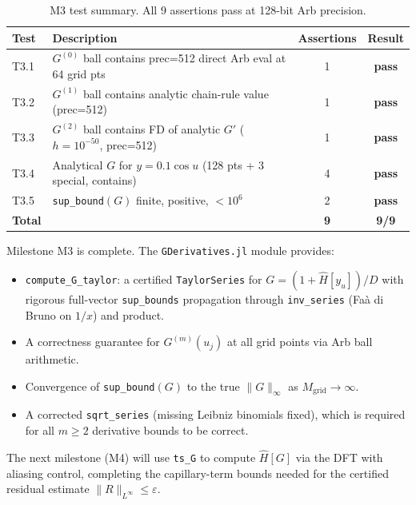 \documentclass[11pt]{article}
\theoremstyle{definition}
\begin{document}
\begin{table}[H]
\centering
\begin{tabular}{llcc}
\toprule
Test & Description & Assertions & Result \\
\midrule
T3.1 & $G^{(0)}$ ball contains prec=512 direct Arb eval at 64 grid pts & 1 &
  \textcolor{green!60!black}{\textbf{pass}} \\
T3.2 & $G^{(1)}$ ball contains analytic chain-rule value (prec=512) & 1 &
  \textcolor{green!60!black}{\textbf{pass}} \\
T3.3 & $G^{(2)}$ ball contains FD of analytic $G'$ ($h=10^{-50}$, prec=512) & 1 &
  \textcolor{green!60!black}{\textbf{pass}} \\
T3.4 & Analytical $G$ for $y = 0.1\cos u$ (128 pts + 3 special, contains) & 4 &
  \textcolor{green!60!black}{\textbf{pass}} \\
T3.5 & \texttt{sup\_bound}$(G)$ finite, positive, $< 10^6$ & 2 &
  \textcolor{green!60!black}{\textbf{pass}} \\
\midrule
\textbf{Total} & & \textbf{9} & \textcolor{green!60!black}{\textbf{9/9}} \\
\bottomrule
\end{tabular}
\caption{M3 test summary. All 9 assertions pass at 128-bit Arb precision.}
\end{table}

Milestone M3 is complete.  The \texttt{GDerivatives.jl} module provides:
\begin{itemize}
  \item \texttt{compute\_G\_taylor}: a certified \texttt{TaylorSeries} for
        $G = (1+\hat H[y_u])/D$ with rigorous full-vector \texttt{sup\_bounds}
        propagation through \texttt{inv\_series} (Fa\`a di Bruno on $1/x$)
        and product.
  \item A correctness guarantee for $G^{(m)}(u_j)$ at all grid points via
        Arb ball arithmetic.
  \item Convergence of \texttt{sup\_bound}$(G)$ to the true $\|G\|_\infty$
        as $M_{\mathrm{grid}} \to \infty$.
  \item A corrected \texttt{sqrt\_series} (missing Leibniz binomials fixed),
        which is required for all $m \ge 2$ derivative bounds to be correct.
\end{itemize}

The next milestone (M4) will use \texttt{ts\_G} to compute $\hat H[G]$ via
the DFT with aliasing control, completing the capillary-term bounds needed
for the certified residual estimate $\|R\|_{L^\infty} \le \varepsilon$.
\end{document}
